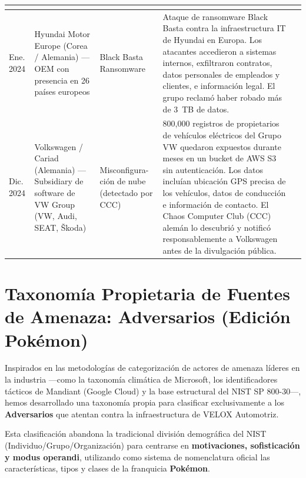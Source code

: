 \documentclass[letterpaper,11pt]{article}
\begin{document}
\begin{tabular}{|p{1.2cm}|p{2.5cm}|p{2.0cm}|p{5.5cm}|p{2.3cm}|}
  \autocite{toyota-disclosure-2023, reuters-toyota-2023} \\
\hline
Ene. 2024 &
  Hyundai Motor Europe (Corea / Alemania) --- OEM con presencia en 26 países europeos &
  Black Basta Ransomware &
  Ataque de ransomware Black Basta contra la infraestructura IT de Hyundai en Europa. Los atacantes accedieron a sistemas internos, exfiltraron contratos, datos personales de empleados y clientes, e información legal. El grupo reclamó haber robado más de 3~TB de datos. &
  \autocite{hyundai-blackbasta-2024} \\
\hline
Dic. 2024 &
  Volkswagen / Cariad (Alemania) --- Subsidiary de software de VW Group (VW, Audi, SEAT, Škoda) &
  Misconfigura-ción de nube (detectado por CCC) &
  800{,}000 registros de propietarios de vehículos eléctricos del Grupo VW quedaron expuestos durante meses en un bucket de AWS S3 sin autenticación. Los datos incluían ubicación GPS precisa de los vehículos, datos de conducción e información de contacto. El Chaos Computer Club (CCC) alemán lo descubrió y notificó responsablemente a Volkswagen antes de la divulgación pública. &
  \autocite{spiegel-vw-breach, securityweek-vw-breach} \\
\hline
\end{tabular}
\endgroup

\newpage
\section{Taxonomía Propietaria de Fuentes de Amenaza: Adversarios (Edición Pokémon)}

Inspirados en las metodologías de categorización de actores de amenaza líderes en la industria ---como la taxonomía climática de Microsoft, los identificadores tácticos de Mandiant (Google Cloud) y la base estructural del NIST SP 800-30---, hemos desarrollado una taxonomía propia para clasificar exclusivamente a los \textbf{Adversarios} que atentan contra la infraestructura de VELOX Automotriz.

Esta clasificación abandona la tradicional división demográfica del NIST (Individuo/Grupo/Organización) para centrarse en \textbf{motivaciones, sofisticación y modus operandi}, utilizando como sistema de nomenclatura oficial las características, tipos y clases de la franquicia \textbf{Pokémon}.
\end{document}
